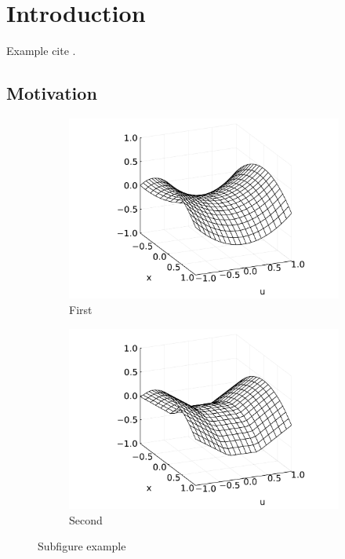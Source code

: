 \chapter{Introduction} \label{chap:intro}

\lipsum[1-1]
Example cite \cite{lee2020vector}.

\section{Motivation}


\begin{figure}
  \centering
  \begin{subfigure}[b]{0.40\linewidth}
    \centering
    \includegraphics[width=1.0\linewidth]{./figures/first.pdf}
    \caption{First}
  \end{subfigure}
  \begin{subfigure}[b]{0.40\linewidth}
    \centering
    \includegraphics[width=1.0\linewidth]{./figures/second.pdf}
    \caption{Second}
  \end{subfigure}

  \caption{Subfigure example~\cite{kimParameterizedConvexUniversal2022}}
  \label{fig:subfigure_example}
\end{figure}

\lipsum[2-5]
